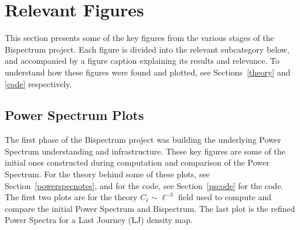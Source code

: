 \documentclass[11pt]{article}
\renewcommand{\_}[1]{\underline{ #1 }}
\begin{document}
{\section{Relevant Figures}\label{relevant_figures}

This section presents some of the key figures from the various stages of the Bispectrum project. Each figure is divided into the relevant subcategory below, and accompanied by a figure caption explaining its results and relevance. To understand how these figures were found and plotted, see Sections~\ref{theory} and \ref{code} respectively.

\subsection{Power Spectrum Plots}\label{psplots}

The first phase of the Bispectrum project was building the underlying Power Spectrum understanding and infrastructure. These key figures are some of the initial ones constructed during computation and comparison of the Power Spectrum. For the theory behind some of these plots, see Section~\ref{powerspecnotes}, and for the code, see Section~\ref{pscode} for the code. The first two plots are for the theory $C_{\ell} \sim \ell^{-3}$ field used to compute and compare the initial Power Spectrum and Bispectrum. The last plot is the refined Power Spectra for a Last Journey (LJ) density map.

}
\end{document}
